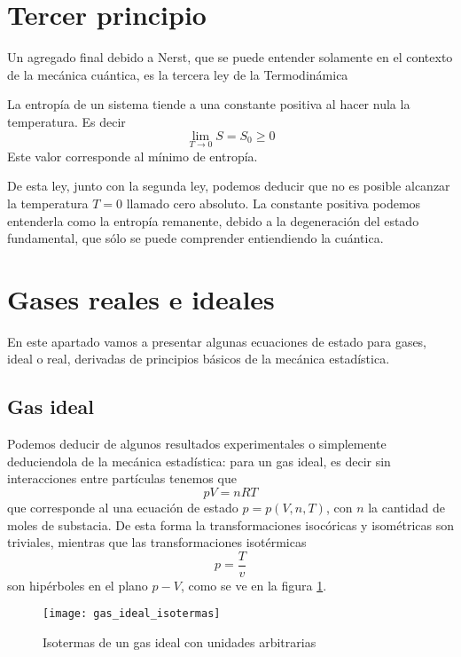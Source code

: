 \section{Tercer principio}
Un agregado final debido a Nerst, que se puede entender solamente en el contexto de la mecánica cuántica, es la tercera ley de la Termodinámica
\begin{law}
La entropía de un sistema tiende a una constante positiva al hacer nula la temperatura. Es decir
\[\displaystyle\lim_{T \to 0} S = S_0 \geq 0\]
Este valor corresponde al mínimo de entropía.
\end{law}
De esta ley, junto con la segunda ley, podemos deducir que no es posible alcanzar la temperatura $T = 0$ llamado cero absoluto.
La constante positiva podemos entenderla como la entropía remanente, debido a la degeneración del estado fundamental, que sólo se puede comprender entiendiendo la cuántica.
\section{Gases reales e ideales}
En este apartado vamos a presentar algunas ecuaciones de estado para gases, ideal o real, derivadas de principios básicos de la mecánica estadística.

\subsection{Gas ideal}
Podemos deducir de algunos resultados experimentales o simplemente deduciendola de la mecánica estadística: para un gas ideal, es decir sin interacciones entre partículas tenemos que
\begin{equation}
p V = n R T
    \label{eq:gas_ideal_estado}
\end{equation}
que corresponde al una ecuación de estado $p = p(V, n, T)$, con $n$ la cantidad de moles de substacia.
De esta forma la transformaciones isocóricas y isométricas son triviales, mientras que las transformaciones isotérmicas
\begin{equation}
    p = \frac{T}{v}
\end{equation}
son hipérboles en el plano $p-V$, como se ve en la figura \ref{fig:gas_ideal_isotermas}.
\begin{figure}[H]
    \centering
    \texttt{[image: gas\_ideal\_isotermas]}
    \caption{Isotermas de un gas ideal con unidades arbitrarias}
    \label{fig:gas_ideal_isotermas}
\end{figure}

